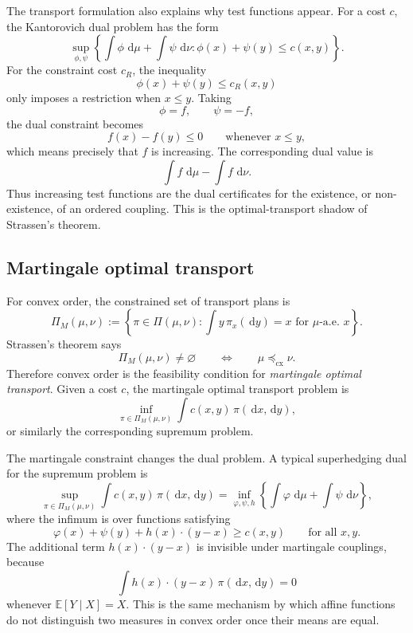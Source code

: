 \documentclass[11pt]{article}
\newcommand{\E}{\mathbb E}
\newcommand{\dd}{\,\mathrm d}
\newcommand{\PiC}{\Pi}
\begin{document}
The transport formulation also explains why test functions appear. For a cost
\(c\), the Kantorovich dual problem has the form
\[
        \sup_{\phi,\psi}
        \left\{
        \int \phi\,\dd\mu+
        \int \psi\,\dd\nu
        :
        \phi(x)+\psi(y)\leq c(x,y)
        \right\}.
\]
For the constraint cost \(c_R\), the inequality
\[
        \phi(x)+\psi(y)\leq c_R(x,y)
\]
only imposes a restriction when \(x\leq y\). Taking
\[
        \phi=f,
        \qquad
        \psi=-f,
\]
the dual constraint becomes
\[
        f(x)-f(y)\leq 0
        \qquad
        \text{whenever } x\leq y,
\]
which means precisely that \(f\) is increasing. The corresponding dual value is
\[
        \int f\,\dd\mu-
        \int f\,\dd\nu.
\]
Thus increasing test functions are the dual certificates for the existence, or
non-existence, of an ordered coupling. This is the optimal-transport shadow of
Strassen's theorem.

\subsection{Martingale optimal transport}

For convex order, the constrained set of transport plans is
\[
        \PiC_M(\mu,\nu)
        :=
        \left\{
        \pi\in\PiC(\mu,\nu):
        \int y\,\pi_x(\dd y)=x\text{ for }\mu\text{-a.e. }x
        \right\}.
\]
Strassen's theorem says
\[
        \PiC_M(\mu,\nu)\neq\varnothing
        \qquad\Longleftrightarrow\qquad
        \mu\preceq_{\mathrm{cx}}\nu.
\]
Therefore convex order is the feasibility condition for \emph{martingale
optimal transport}. Given a cost \(c\), the martingale optimal transport problem
is
\[
        \inf_{\pi\in\PiC_M(\mu,\nu)}
        \int c(x,y)\,\pi(\dd x,\dd y),
\]
or similarly the corresponding supremum problem.

The martingale constraint changes the dual problem. A typical superhedging dual
for the supremum problem is
\[
        \sup_{\pi\in\PiC_M(\mu,\nu)}
        \int c(x,y)\,\pi(\dd x,\dd y)
        =
        \inf_{\varphi,\psi,h}
        \left\{
        \int \varphi\,\dd\mu+
        \int \psi\,\dd\nu
        \right\},
\]
where the infimum is over functions satisfying
\[
        \varphi(x)+\psi(y)+h(x)\cdot (y-x)
        \geq
        c(x,y)
        \qquad
        \text{for all }x,y.
\]
The additional term \(h(x)\cdot(y-x)\) is invisible under martingale couplings,
because
\[
        \int h(x)\cdot(y-x)\,\pi(\dd x,\dd y)
        =0
\]
whenever \(\E[Y\mid X]=X\). This is the same mechanism by which affine
functions do not distinguish two measures in convex order once their means are
equal.
\end{document}
